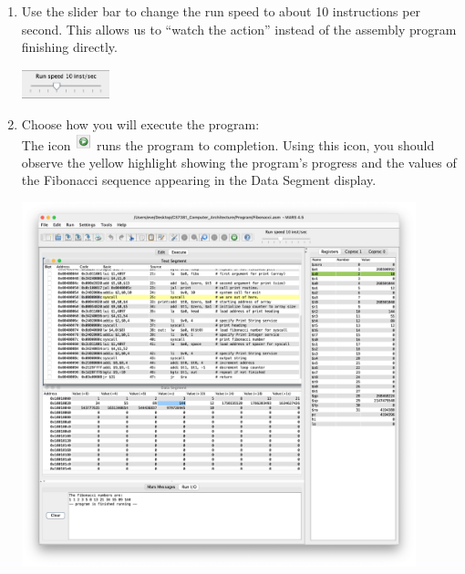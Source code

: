 \documentclass[12pt]{article}
\begin{document}
\begin{enumerate}
 
    \item Use the slider bar to change the run speed to about 10 instructions per second. This allows us to “watch the action” instead of the assembly program finishing directly.
    \begin{center}
            \includegraphics[width=0.2\textwidth]{17.png}
    \end{center}
    
     \newpage
    \item Choose how you will execute the program:\\
    The icon \includegraphics[width=0.04\textwidth]{18.png} runs the program to completion. Using this icon, you should observe the yellow highlight showing the program’s progress and the values of the Fibonacci sequence appearing in the Data Segment display.
    \begin{center}
            \includegraphics[width=0.9\textwidth]{19.png}
    \end{center}


\end{enumerate}
\end{document}
